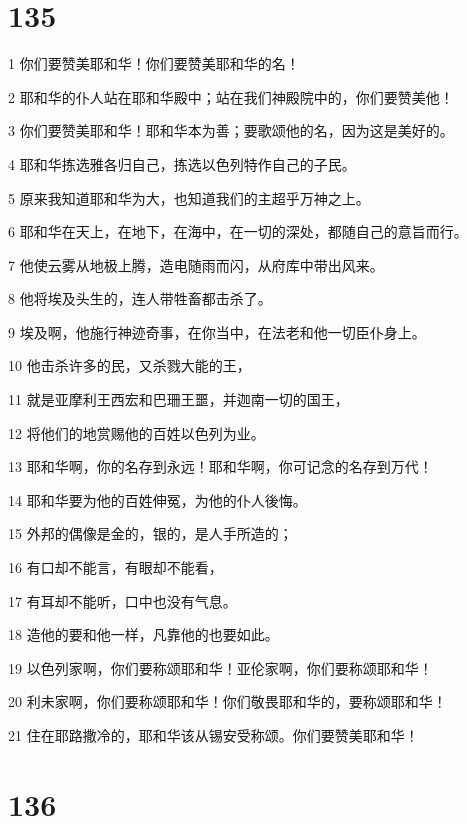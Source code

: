 \chapter{135}

\par 1 你们要赞美耶和华！你们要赞美耶和华的名！
\par 2 耶和华的仆人站在耶和华殿中；站在我们神殿院中的，你们要赞美他！
\par 3 你们要赞美耶和华！耶和华本为善；要歌颂他的名，因为这是美好的。
\par 4 耶和华拣选雅各归自己，拣选以色列特作自己的子民。
\par 5 原来我知道耶和华为大，也知道我们的主超乎万神之上。
\par 6 耶和华在天上，在地下，在海中，在一切的深处，都随自己的意旨而行。
\par 7 他使云雾从地极上腾，造电随雨而闪，从府库中带出风来。
\par 8 他将埃及头生的，连人带牲畜都击杀了。
\par 9 埃及啊，他施行神迹奇事，在你当中，在法老和他一切臣仆身上。
\par 10 他击杀许多的民，又杀戮大能的王，
\par 11 就是亚摩利王西宏和巴珊王噩，并迦南一切的国王，
\par 12 将他们的地赏赐他的百姓以色列为业。
\par 13 耶和华啊，你的名存到永远！耶和华啊，你可记念的名存到万代！
\par 14 耶和华要为他的百姓伸冤，为他的仆人後悔。
\par 15 外邦的偶像是金的，银的，是人手所造的；
\par 16 有口却不能言，有眼却不能看，
\par 17 有耳却不能听，口中也没有气息。
\par 18 造他的要和他一样，凡靠他的也要如此。
\par 19 以色列家啊，你们要称颂耶和华！亚伦家啊，你们要称颂耶和华！
\par 20 利未家啊，你们要称颂耶和华！你们敬畏耶和华的，要称颂耶和华！
\par 21 住在耶路撒冷的，耶和华该从锡安受称颂。你们要赞美耶和华！

\chapter{136}


